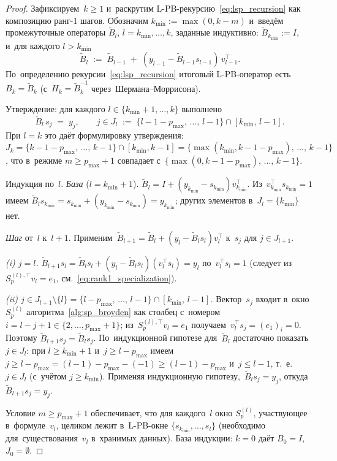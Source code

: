 \begin{proof}
Зафиксируем~$k\ge 1$ и~раскрутим L-PB-рекурсию~\eqref{eq:lsp_recursion}
как композицию ранг-1 шагов. Обозначим
$k_{\min}:=\max(0,k-m)$ и~введём промежуточные операторы
$\widetilde B_l$, $l=k_{\min},\ldots,k$, заданные индуктивно:
$\widetilde B_{k_{\min}}:=I$, и~для каждого $l>k_{\min}$
\[
   \widetilde B_l \;:=\; \widetilde B_{l-1}
                       \;+\; (y_{l-1} - \widetilde B_{l-1} s_{l-1})\,v_{l-1}^\top.
\]
По~определению рекурсии~\eqref{eq:lsp_recursion} итоговый L-PB-оператор
есть $B_k=\widetilde B_k$ (с~$H_k=\widetilde B_k^{-1}$ через~Шермана--Моррисона).

Утверждение: для каждого $l\in\{k_{\min}{+}1,\ldots,k\}$ выполнено
\begin{equation}\label{eq:lpb_induct}
   \widetilde B_l\, s_j \;=\; y_j,
   \qquad j\in J_l\;:=\;\{l-1-p_{\max},\,\ldots,\,l-1\}\cap[k_{\min},\,l-1].
\end{equation}
При $l=k$ это даёт формулировку утверждения: $J_k=\{k-1-p_{\max},\,\ldots,\,k-1\}\cap[k_{\min},k-1]
=\{\max(k_{\min},k-1-p_{\max}),\,\ldots,\,k-1\}$, что в~режиме $m\ge p_{\max}+1$
совпадает с~$\{\max(0,k-1-p_{\max}),\,\ldots,\,k-1\}$.

Индукция по~$l$. \emph{База} ($l=k_{\min}+1$). $\widetilde B_l =
I + (y_{k_{\min}} - s_{k_{\min}})v_{k_{\min}}^\top$.
Из~$v_{k_{\min}}^\top s_{k_{\min}}=1$ имеем
$\widetilde B_l s_{k_{\min}}=s_{k_{\min}}+(y_{k_{\min}}-s_{k_{\min}})=y_{k_{\min}}$;
других элементов в~$J_l=\{k_{\min}\}$ нет.

\emph{Шаг} от~$l$ к~$l+1$. Применим~$\widetilde B_{l+1}=\widetilde B_l+
(y_l-\widetilde B_l s_l)v_l^\top$ к~$s_j$ для $j\in J_{l+1}$.

\textit{(i) $j=l$.} $\widetilde B_{l+1} s_l=\widetilde B_l s_l+
(y_l-\widetilde B_l s_l)(v_l^\top s_l)=y_l$ по~$v_l^\top s_l=1$
(следует из~$S_p^{(l),\top}v_l=e_1$, см.~\eqref{eq:rank1_specialization}).

\textit{(ii) $j\in J_{l+1}\setminus\{l\}=\{l-p_{\max},\,\ldots,\,l-1\}\cap[k_{\min},\,l-1]$.}
Вектор~$s_j$ входит в~окно $S_p^{(l)}$ алгоритма~\ref{alg:sp_broyden}
как столбец с~номером $i=l-j+1\in\{2,\ldots,p_{\max}+1\}$; из~$S_p^{(l),\top}v_l=e_1$
получаем~$v_l^\top s_j=(e_1)_i=0$. Поэтому $\widetilde B_{l+1} s_j=
\widetilde B_l s_j$. По~индукционной гипотезе для~$\widetilde B_l$ достаточно
показать~$j\in J_l$: при $l\ge k_{\min}+1$ и~$j\ge l-p_{\max}$ имеем
$j\ge l-p_{\max}=(l-1)-p_{\max}-(-1)\ge(l-1)-p_{\max}$ и~$j\le l-1$,
т.~е.~$j\in J_l$ (с~учётом $j\ge k_{\min}$).
Применяя индукционную гипотезу,~$\widetilde B_l s_j=y_j$,
откуда $\widetilde B_{l+1} s_j=y_j$.

Условие $m\ge p_{\max}+1$ обеспечивает, что для каждого~$l$ окно $S_p^{(l)}$,
участвующее в~формуле~$v_l$, целиком лежит в~L-PB-окне
$\{s_{k_{\min}},\ldots,s_{l}\}$ (необходимо для~существования~$v_l$
в~хранимых данных). База индукции: $k=0$ даёт $B_0=I$, $J_0=\emptyset$.
\end{proof}

